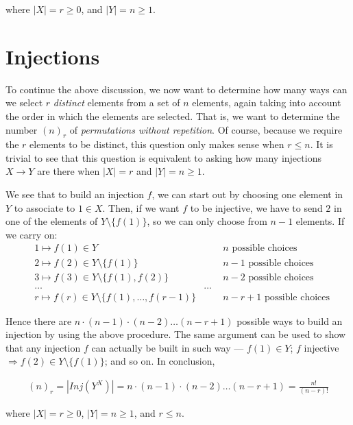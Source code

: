 \documentclass{amsart}
\begin{document}
\noindent where $|X| = r \ge 0$, and $|Y| = n \ge 1$.



\section*{Injections}
To continue the above discussion, we now want to determine how many ways can we select 
$r$ \emph{distinct} elements from a set of $n$ elements, again taking into account the order
in which the elements are selected.  That is, we want to determine the number $(n)_{r}$ of
\emph{permutations without repetition}.  Of course, because we require the $r$ elements to be
distinct, this question only makes sense when $r \le n$.  It is trivial to see that this 
question is equivalent to asking how many injections $X \rightarrow Y$ are there when 
$|X|=r$ and $|Y|=n \ge 1$.

We see that to build an injection $f$, we can start out by choosing one element in $Y$ to
associate to $1 \in X$.  Then, if we want $f$ to be injective, we have to send $2$ in one
of the elements of $Y \setminus \{f(1)\}$, so we can only choose from $n-1$ elements.  If
we carry on:
\begin{align*}
&1 \longmapsto f(1) \in Y & \quad \quad \text{$n$ possible choices} \\
&2 \longmapsto f(2) \in Y \setminus \{f(1)\}& \quad \quad \text{$n-1$ possible choices} \\
&3 \longmapsto f(3) \in Y \setminus \{f(1),f(2)\}& \quad \quad \text{$n-2$ possible choices} \\
&\ldots & \ldots \\
&r \longmapsto f(r) \in Y \setminus \{f(1),\ldots,f(r-1)\}& \quad \quad \text{$n-r+1$ possible choices} 
\end{align*}

Hence there are $n \cdot (n-1) \cdot (n-2) \ldots (n-r+1)$ possible ways to build an injection
by using the above procedure.  The same argument can be used to show that any injection $f$ can
actually be built in such way --- $f(1) \in Y$; $f$ injective $\Rightarrow f(2) \in Y \setminus \{f(1)\}$;
and so on.  In conclusion,

\begin{align}
(n)_{r} = |Inj(Y^{X})| = n \cdot (n-1) \cdot (n-2) \ldots (n-r+1) = \frac{n!}{(n-r)!}
\end{align}

\noindent where $|X| = r \ge 0$, $|Y| = n \ge 1$, and $r \le n$.
\end{document}
